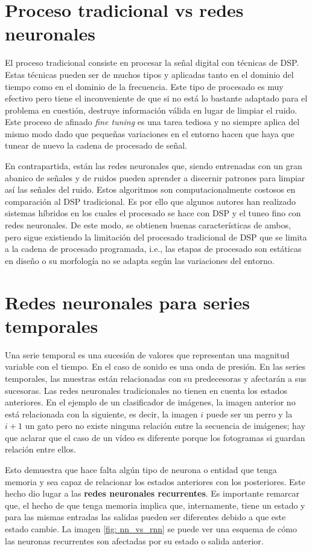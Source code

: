 \section{Proceso tradicional vs redes neuronales}
El proceso tradicional consiste en procesar la señal digital con técnicas de \gls{DSP}. Estas técnicas pueden ser de muchos tipos y aplicadas tanto en el dominio del tiempo como en el dominio de la frecuencia. Este tipo de procesado es muy efectivo pero tiene el inconveniente de que si no está lo bastante adaptado para el problema en cuestión, destruye información válida en lugar de limpiar el ruido. Este proceso de afinado \textit{fine tuning} es una tarea tediosa y no siempre aplica del mismo modo dado que pequeñas variaciones en el entorno hacen que haya que tunear de nuevo la cadena de procesado de señal.

En contrapartida, están las redes neuronales que, siendo entrenadas con un gran abanico de señales y de ruidos pueden aprender a discernir patrones para limpiar así las señales del ruido. Estos algoritmos son computacionalmente costosos en comparación al \gls{DSP} tradicional. Es por ello que algunos autores han realizado sistemas híbridos en los cuales el procesado se hace con \gls{DSP} y el tuneo fino con redes neuronales. De este modo, se obtienen buenas características de ambos, pero sigue existiendo la limitación del procesado tradicional de \gls{DSP} que se limita a la cadena de procesado programada, i.e., las etapas de procesado son estáticas en diseño o su morfología no se adapta según las variaciones del entorno.

\section{Redes neuronales para series temporales}
Una serie temporal es una sucesión de valores que representan una magnitud variable con el tiempo. En el caso de sonido es una onda de presión. En las series temporales, las muestras están relacionadas con su predecesoras y afectarán a sus sucesoras. Las redes neuronales tradicionales no tienen en cuenta los estados anteriores. En el ejemplo de un clasificador de imágenes, la imagen anterior no está relacionada con la siguiente, es decir, la imagen $i$ puede ser un perro y la $i+1$ un gato pero no existe ninguna relación entre la secuencia de imágenes; hay que aclarar que el caso de un vídeo es diferente porque los fotogramas si guardan relación entre ellos.

Esto demuestra que hace falta algún tipo de neurona o entidad que tenga memoria y sea capaz de relacionar los estados anteriores con los posteriores. Este hecho dio lugar a las \textbf{redes neuronales recurrentes}. Es importante remarcar que, el hecho de que tenga memoria implica que, internamente, tiene un estado y para las mismas entradas las salidas pueden ser diferentes debido a que este estado cambie. La imagen \ref{fig: nn_vs_rnn} se puede ver una esquema de cómo las neuronas recurrentes son afectadas por su estado o salida anterior.

